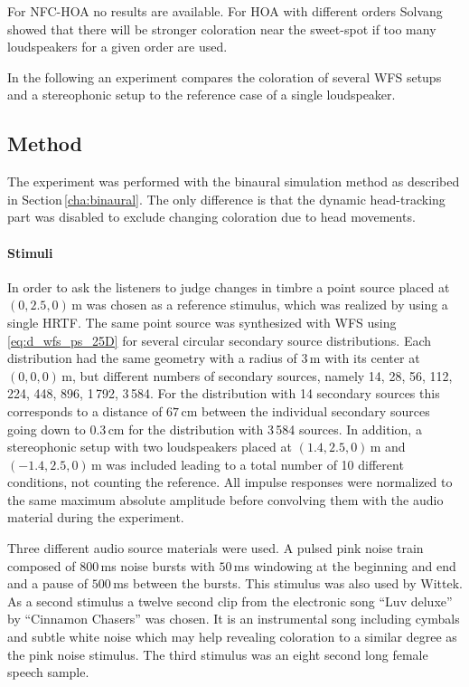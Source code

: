 For \ac{NFC-HOA} no results are available. For \ac{HOA} with different orders
Solvang\autocite{Solvang2008} showed that there will be stronger coloration near
the sweet-spot if too many loudspeakers for a given order are used.

In the following an experiment compares the coloration of several \ac{WFS} setups and a
stereophonic setup to the reference case of a single loudspeaker.


\subsection{Method}
\label{sec:coloration_method}
%

The experiment was performed with the binaural simulation method as described in
Section\,\ref{cha:binaural}. The only difference is that the dynamic
head-tracking part was disabled to exclude changing coloration due to head
movements.

\paragraph{Stimuli}
%
In order to ask the listeners to judge changes in timbre a point source placed at
$(0,2.5,0)$\,m was chosen as a reference stimulus, which was realized by using a
single \ac{HRTF}. The same point source was synthesized with \ac{WFS} using
\eqref{eq:d_wfs_ps_25D} for several circular secondary source distributions.
Each distribution had the
same geometry with a radius of $3$\,m with its center at $(0,0,0)$\,m, but
different numbers of secondary sources, namely 14, 28, 56, 112, 224, 448, 896,
1\,792, 3\,584. For the distribution with 14 secondary sources this corresponds to
a distance of $67$\,cm between the individual secondary sources going down
to $0.3$\,cm for the distribution with 3\,584 sources.
In addition, a stereophonic setup with two loudspeakers placed at $(1.4,2.5,0)$\,m
and $(-1.4,2.5,0)$\,m was included leading to a total number of 10 different
conditions, not counting the reference.
All impulse responses were normalized to the same maximum absolute amplitude
before convolving them with the audio material during the experiment.

Three different audio source materials were used.
A pulsed pink noise train composed of $800$\,ms noise bursts with $50$\,ms windowing
at the beginning and end and a pause of $500$\,ms between the bursts. This
stimulus was also used by Wittek.\autocite[][Sec.\,8.2]{Wittek2007}
As a second stimulus a twelve second clip from the electronic song ``Luv
deluxe'' by ``Cinnamon Chasers'' was chosen. It is an instrumental song including
cymbals and subtle white noise which may help revealing coloration to a similar
degree as the pink noise stimulus. The third stimulus was an eight second long
female speech sample.

